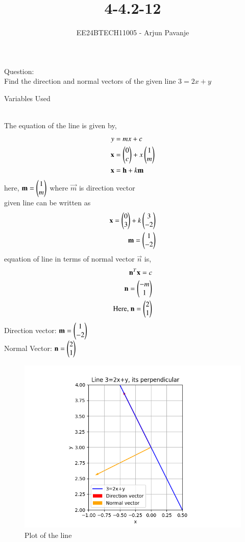 \documentclass[journal]{IEEEtran}
\begin{document}

\vspace{3cm}

\title{4-4.2-12}
\author{EE24BTECH11005 - Arjun Pavanje}
{\let\newpage\relax\maketitle}
Question:\\
Find the direction and normal vectors of the given line $3=2x+y$
\begin{table}[h!]    
  \centering
  
  \caption{Variables Used}
  \label{tab1-1.9-6}
\end{table}\\
\solution
The equation of the line is given by,
\begin{align}
	y&=mx+c\\
	\mathbf{x}&=\begin{pmatrix}0\\c\end{pmatrix}+ x \begin{pmatrix}1\\m\end{pmatrix}\\
	\mathbf{x}&=\mathbf{h}+k\mathbf{m}
\end{align}
here, $\mathbf{m}=\begin{pmatrix}1\\m\end{pmatrix}$ where $\vec{m}$ is direction vector\\
given line can be written as
\begin{align}
\mathbf{x}=\begin{pmatrix}0\\3\end{pmatrix}+k\begin{pmatrix}3\\-2\end{pmatrix}\\
\mathbf{m}=\begin{pmatrix}1\\-2\end{pmatrix}
\end{align}
equation of line in terms of normal vector $\vec{n}$ is,
\begin{align}
\mathbf{n}^T\mathbf{x}=c\\
	\mathbf{n}=\begin{pmatrix}-m\\1\end{pmatrix}\\
	\text{Here, }\mathbf{n}=\begin{pmatrix}2\\1\end{pmatrix}
\end{align}
Direction vector: $\mathbf{m}=\begin{pmatrix}1\\-2\end{pmatrix}$\\
Normal Vector: $\mathbf{n}=\begin{pmatrix}2\\1\end{pmatrix}$
\begin{figure}[h!]
   \centering
   \includegraphics[width = 1\linewidth]{figs/fig.png}
   \caption{Plot of the line}
   \label{stemplot}
\end{figure}
\end{document}
